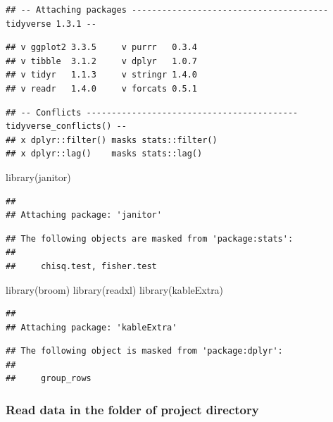 \documentclass[
]{article}
\newenvironment{Shaded}{\begin{snugshade}}{\end{snugshade}}
\newcommand{\FunctionTok}[1]{\textcolor[rgb]{0.00,0.00,0.00}{#1}}
\newcommand{\NormalTok}[1]{#1}
\begin{document}
\begin{verbatim}
## -- Attaching packages --------------------------------------- tidyverse 1.3.1 --
\end{verbatim}

\begin{verbatim}
## v ggplot2 3.3.5     v purrr   0.3.4
## v tibble  3.1.2     v dplyr   1.0.7
## v tidyr   1.1.3     v stringr 1.4.0
## v readr   1.4.0     v forcats 0.5.1
\end{verbatim}

\begin{verbatim}
## -- Conflicts ------------------------------------------ tidyverse_conflicts() --
## x dplyr::filter() masks stats::filter()
## x dplyr::lag()    masks stats::lag()
\end{verbatim}

\begin{Shaded}
\begin{Highlighting}[]
\FunctionTok{library}\NormalTok{(janitor)}
\end{Highlighting}
\end{Shaded}

\begin{verbatim}
## 
## Attaching package: 'janitor'
\end{verbatim}

\begin{verbatim}
## The following objects are masked from 'package:stats':
## 
##     chisq.test, fisher.test
\end{verbatim}

\begin{Shaded}
\begin{Highlighting}[]
\FunctionTok{library}\NormalTok{(broom)}
\FunctionTok{library}\NormalTok{(readxl)}
\FunctionTok{library}\NormalTok{(kableExtra)}
\end{Highlighting}
\end{Shaded}

\begin{verbatim}
## 
## Attaching package: 'kableExtra'
\end{verbatim}

\begin{verbatim}
## The following object is masked from 'package:dplyr':
## 
##     group_rows
\end{verbatim}

\hypertarget{read-data-in-the-folder-of-project-directory}{%
\subsubsection{Read data in the folder of project
directory}\label{read-data-in-the-folder-of-project-directory}}
\end{document}
